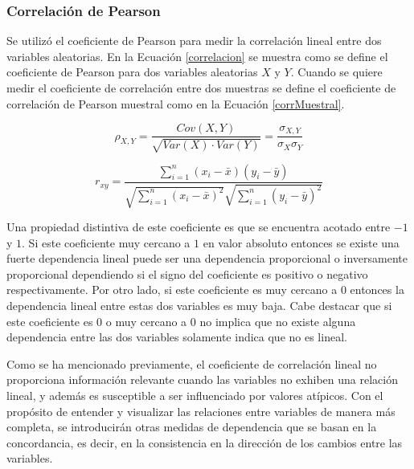 \subsubsection{Correlación de Pearson}

Se utilizó el coeficiente de Pearson para medir la correlación lineal entre dos variables aleatorias. En la Ecuación \eqref{correlacion} se muestra como se define el coeficiente de Pearson para dos variables aleatorias $X$ y $Y$. Cuando se quiere medir el coeficiente de correlación entre dos muestras se define el coeficiente de correlación de Pearson muestral como en la Ecuación \eqref{corrMuestral}.

\begin{equation}\label{correlacion}
    \rho_{X, Y} = \frac{Cov(X, Y)}{\sqrt{Var(X) \cdot Var(Y)}} = \frac{\sigma_{X, Y}}{\sigma_X \sigma_Y}
\end{equation}

\begin{equation}\label{corrMuestral}
    r_{x y}=\frac{\sum_{i=1}^n\left(x_i-\bar{x}\right)\left(y_i-\bar{y}\right)}{\sqrt{\sum_{i=1}^n\left(x_i-\bar{x}\right)^2} \sqrt{\sum_{i=1}^n\left(y_i-\bar{y}\right)^2}}
\end{equation}

 Una propiedad distintiva de este coeficiente es que se encuentra acotado entre $-1$ y $1$. Si este coeficiente muy cercano a $1$ en valor absoluto entonces se existe una fuerte dependencia lineal puede ser una dependencia proporcional o inversamente proporcional dependiendo si el signo del coeficiente es positivo o negativo respectivamente. Por otro lado, si este coeficiente es muy cercano a 0 entonces la dependencia lineal entre estas dos variables es muy baja. Cabe destacar que si este coeficiente es 0 o muy cercano a 0 no implica que no existe alguna dependencia entre las dos variables solamente indica que no es lineal.

Como se ha mencionado previamente, el coeficiente de correlación lineal no proporciona información relevante cuando las variables no exhiben una relación lineal, y además es susceptible a ser influenciado por valores atípicos. Con el propósito de entender y visualizar las relaciones entre variables de manera más completa, se introducirán otras medidas de dependencia que se basan en la concordancia, es decir, en la consistencia en la dirección de los cambios entre las variables.



